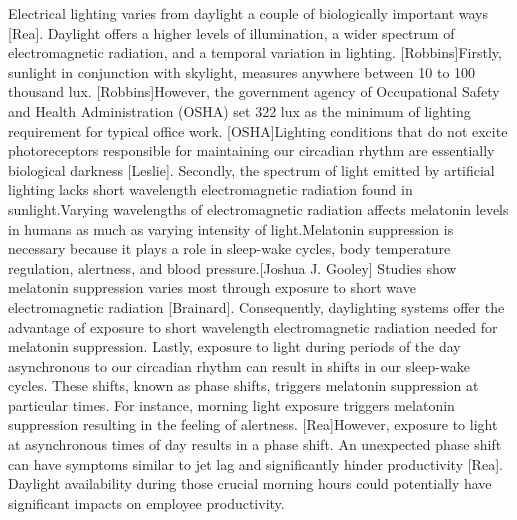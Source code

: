 Electrical lighting varies from daylight a couple of biologically important ways [Rea]. Daylight offers a higher levels of illumination, a wider spectrum of electromagnetic radiation, and a temporal variation in lighting. [Robbins]Firstly, sunlight in conjunction with skylight, measures anywhere between 10 to 100 thousand lux. [Robbins]However, the government agency of Occupational Safety and Health Administration (OSHA) set 322 lux as the minimum of lighting requirement for typical office work. [OSHA]Lighting conditions that do not excite photoreceptors responsible for maintaining our circadian rhythm are essentially biological darkness [Leslie].  Secondly, the spectrum of light emitted by artificial lighting lacks short wavelength electromagnetic radiation found in sunlight.Varying wavelengths of electromagnetic radiation affects melatonin levels in humans as much as varying intensity of light.Melatonin suppression is necessary because it plays a role in sleep-wake cycles, body temperature regulation, alertness, and blood pressure.[Joshua J. Gooley] Studies show melatonin suppression varies most through exposure to short wave electromagnetic radiation [Brainard]. Consequently, daylighting systems offer the advantage of exposure to short wavelength electromagnetic radiation needed for melatonin suppression. Lastly, exposure to light during periods of the day asynchronous to our circadian rhythm can result in shifts in our sleep-wake cycles. These shifts, known as phase shifts, triggers melatonin suppression at particular times. For instance,  morning light exposure triggers melatonin suppression resulting in the feeling of alertness. [Rea]However, exposure to light at asynchronous times of day results in a phase shift. An unexpected phase shift can have symptoms similar to jet lag and significantly hinder productivity [Rea]. Daylight availability during those crucial morning hours could potentially have significant impacts on employee productivity. 

